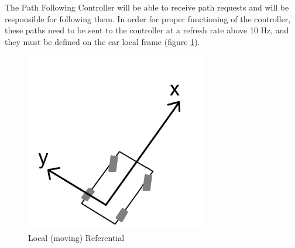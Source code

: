 \documentclass{article}
\begin{document}
The Path Following Controller will be able to receive path requests and will be responsible for following them. In order for proper functioning of the controller, these paths need to be sent to the controller at a refresh rate above 10 Hz, and they must be defined on the car local frame (figure \ref{fig:localReferential}).

\begin{figure}[h!]
\centering
\includegraphics[width=0.7\textwidth]{localReferential}
\caption{Local (moving) Referential}
\label{fig:localReferential}
\end{figure} 

%	
%
% 
\end{document}
